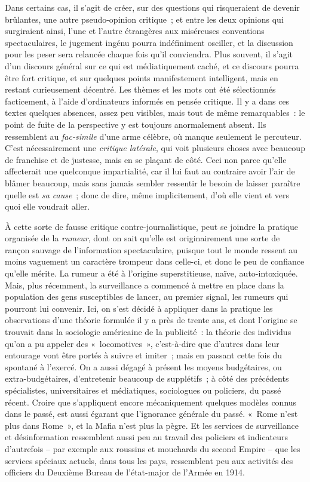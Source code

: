 \documentclass[french,twoside]{book} %
\begin{document}
Dans certains cas, il s’agit de créer, sur des questions qui risqueraient de devenir brûlantes, une autre pseudo-opinion critique ; et entre les deux opinions qui surgiraient ainsi, l’une et l’autre étrangères aux miséreuses conventions spectaculaires, le jugement ingénu pourra indéfiniment osciller, et la discussion pour les peser sera relancée chaque fois qu’il conviendra. Plus souvent, il s’agit d’un discours général sur ce qui est médiatiquement caché, et ce discours pourra être fort critique, et sur quelques points manifestement intelligent, mais en restant curieusement décentré. Les thèmes et les mots ont été sélectionnés facticement, à l’aide d’ordinateurs informés en pensée critique. Il y a dans ces textes quelques absences, assez peu visibles, mais tout de même remarquables : le point de fuite de la perspective y est toujours anormalement absent. Ils ressemblent au \emph{fac-simile} d’une arme célèbre, où manque seulement le percuteur. C’est nécessairement une \emph{critique latérale}, qui voit plusieurs choses avec beaucoup de franchise et de justesse, mais en se plaçant de côté. Ceci non parce qu’elle affecterait une quelconque impartialité, car il lui faut au contraire avoir l’air de blâmer beaucoup, mais sans jamais sembler ressentir le besoin de laisser paraître quelle est \emph{sa cause} ; donc de dire, même implicitement, d’où elle vient et vers quoi elle voudrait aller.\par
À cette sorte de fausse critique contre-journalistique, peut se joindre la pratique organisée de la \emph{rumeur}, dont on sait qu’elle est originairement une sorte de rançon sauvage de l’information spectaculaire, puisque tout le monde ressent au moins vaguement un caractère trompeur dans celle-ci, et donc le peu de confiance qu’elle mérite. La rumeur a été à l’origine superstitieuse, naïve, auto-intoxiquée. Mais, plus récemment, la surveillance a commencé à mettre en place dans la population des gens susceptibles de lancer, au premier signal, les rumeurs qui pourront lui convenir. Ici, on s’est décidé à appliquer dans la pratique les observations d’une théorie formulée il y a près de trente ans, et dont l’origine se trouvait dans la sociologie américaine de la publicité : la théorie des individus qu’on a pu appeler des « locomotives », c’est-à-dire que d’autres dans leur entourage vont être portés à suivre et imiter ; mais en passant cette fois du spontané à l’exercé. On a aussi dégagé à présent les moyens budgétaires, ou extra-budgétaires, d’entretenir beaucoup de supplétifs ; à côté des précédents spécialistes, universitaires et médiatiques, sociologues ou policiers, du passé récent. Croire que s’appliquent encore mécaniquement quelques modèles connus dans le passé, est aussi égarant que l’ignorance générale du passé. « Rome n’est plus dans Rome », et la Mafia n’est plus la pègre. Et les services de surveillance et désinformation ressemblent aussi peu au travail des policiers et indicateurs d’autrefois – par exemple aux roussins et mouchards du second Empire – que les services spéciaux actuels, dans tous les pays, ressemblent peu aux activités des officiers du Deuxième Bureau de l’état-major de l’Armée en 1914.\par
\end{document}
